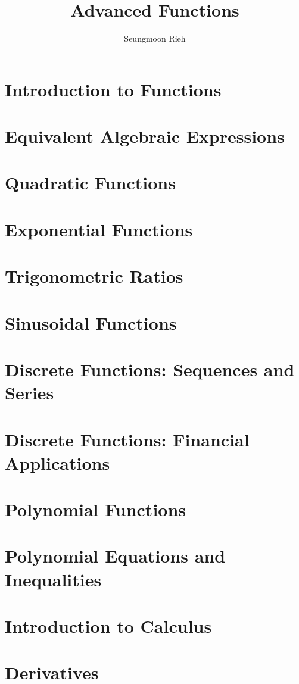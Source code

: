 \documentclass{article}
\title{Advanced Functions}
\author{Seungmoon Rieh}
\begin{document}
\maketitle
\section{Introduction to Functions}
\blindtext
\section{Equivalent Algebraic
Expressions}
\blindtext
\section{Quadratic Functions}
\blindtext
\section{Exponential Functions}
\blindtext
\section{Trigonometric Ratios}
\blindtext
\section{Sinusoidal Functions}
\blindtext
\section{Discrete Functions:
Sequences and Series}
\blindtext
\section{Discrete Functions: Financial
Applications}
\blindtext
\section{Polynomial Functions}
\blindtext
\section{Polynomial Equations and Inequalities}
\blindtext
\section{Introduction to Calculus}
\blindtext
\section{Derivatives}
\blindtext
\end{document}
